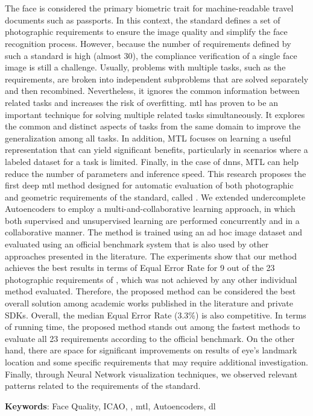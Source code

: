 \section*{}

The face is considered the primary biometric trait for machine-readable travel documents such as passports. In this context, the \icao standard defines a set of photographic requirements to ensure the image quality and simplify the face recognition process. However, because the number of requirements defined by such a standard is high (almost 30), the compliance verification of a single face image is still a challenge. Usually, problems with multiple tasks, such as the \icao requirements, are broken into independent subproblems that are solved separately and then recombined. Nevertheless, it ignores the common information between related tasks and increases the risk of overfitting. \acf{mtl} has proven to be an important technique for solving multiple related tasks simultaneously. It explores the common and distinct aspects of tasks from the same domain to improve the generalization among all tasks. In addition, MTL focuses on learning a useful representation that can yield significant benefits, particularly in scenarios where a labeled dataset for a task is limited. Finally, in the case of \aclp{dnn}, MTL can help reduce the number of parameters and inference speed. This research proposes the first deep \acl{mtl} method designed for automatic evaluation of both photographic and geometric requirements of the \icao standard, called \methodname. We extended undercomplete Autoencoders to employ a multi-and-collaborative learning approach, in which both supervised and unsupervised learning are performed concurrently and in a collaborative manner. The method is trained using an ad hoc image dataset and evaluated using an official benchmark system that is also used by other approaches presented in the literature. The experiments show that our method achieves the best results in terms of Equal Error Rate for 9 out of the 23 photographic requirements of \icao, which was not achieved by any other individual method evaluated. Therefore, the proposed method can be considered the best overall solution among academic works published in the literature and private SDKs. Overall, the median Equal Error Rate (3.3\%) is also competitive. In terms of running time, the proposed method stands out among the fastest methods to evaluate all 23 requirements according to the official benchmark. On the other hand, there are space for significant improvements on results of eye's landmark location and some specific requirements that may require additional investigation. Finally, through Neural Network visualization techniques, we observed relevant patterns related to the requirements of the \icao standard. 

\vspace{2em}

\noindent
\textbf{Keywords}: Face Quality, ICAO, \icao, \acl{mtl}, Autoencoders, \acl{dl}

\newpage
